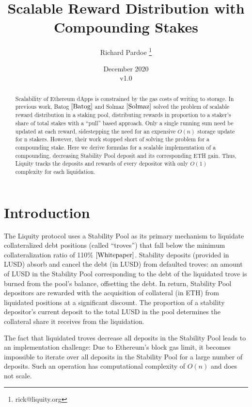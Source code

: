 \documentclass[reqno]{article}
\begin{document}
\title{\textbf{Scalable Reward Distribution with Compounding Stakes}}
\author{Richard Pardoe \thanks{rick@liquity.org}}
\date{December 2020\\v1.0}
\maketitle
\begin{abstract}
    Scalability of Ethereum dApps is constrained by the gas costs of writing to storage. 
    In previous work, Batog $\cite{Batog}$ and Solmaz $\cite{Solmaz}$ solved the problem of scalable reward distribution in a staking pool, distributing rewards in proportion to a staker’s share of total stakes with a ``pull'' based approach. Only a single running sum need be updated at each reward, sidestepping the need for an expensive $O(n)$ storage update for n stakers. However, their work stopped short of solving the problem for a compounding stake.
    Here we derive formulas for a scalable implementation of a compounding, decreasing Stability Pool deposit and its corresponding ETH gain. Thus, Liquity tracks the deposits and rewards of every depositor with only $O(1)$ complexity for each liquidation.
\end{abstract}

\section{Introduction}
The Liquity protocol uses a Stability Pool as its primary mechanism to liquidate collateralized debt positions (called ``troves'') that fall below the minimum collateralization ratio of 110$\%$ $\cite{Whitepaper}$. Stability deposits (provided in LUSD) absorb and cancel the debt (in LUSD) from defaulted troves: an amount of LUSD in the Stability Pool corresponding to the debt of the liquidated trove is burned from the pool’s balance, offsetting the debt. In return, Stability Pool depositors are rewarded with the acquisition of collateral (in ETH) from liquidated positions at a significant discount. The proportion of a stability depositor’s current deposit to the total LUSD in the pool determines the collateral share it receives from the liquidation. 

The fact that liquidated troves decrease all deposits in the Stability Pool leads to an implementation challenge: Due to Ethereum's block gas limit, it becomes impossible to iterate over all deposits in the Stability Pool for a large number of deposits. Such an operation has computational complexity of $O(n)$ and does not scale. 
\end{document}
